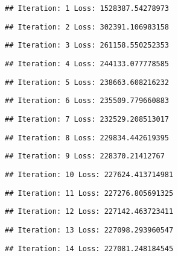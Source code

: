 \documentclass[
]{article}
\begin{document}
\begin{verbatim}
## Iteration: 1 Loss: 1528387.54278973
\end{verbatim}

\begin{verbatim}
## Iteration: 2 Loss: 302391.106983158
\end{verbatim}

\begin{verbatim}
## Iteration: 3 Loss: 261158.550252353
\end{verbatim}

\begin{verbatim}
## Iteration: 4 Loss: 244133.077778585
\end{verbatim}

\begin{verbatim}
## Iteration: 5 Loss: 238663.608216232
\end{verbatim}

\begin{verbatim}
## Iteration: 6 Loss: 235509.779660883
\end{verbatim}

\begin{verbatim}
## Iteration: 7 Loss: 232529.208513017
\end{verbatim}

\begin{verbatim}
## Iteration: 8 Loss: 229834.442619395
\end{verbatim}

\begin{verbatim}
## Iteration: 9 Loss: 228370.21412767
\end{verbatim}

\begin{verbatim}
## Iteration: 10 Loss: 227624.413714981
\end{verbatim}

\begin{verbatim}
## Iteration: 11 Loss: 227276.805691325
\end{verbatim}

\begin{verbatim}
## Iteration: 12 Loss: 227142.463723411
\end{verbatim}

\begin{verbatim}
## Iteration: 13 Loss: 227098.293960547
\end{verbatim}

\begin{verbatim}
## Iteration: 14 Loss: 227081.248184545
\end{verbatim}
\end{document}
